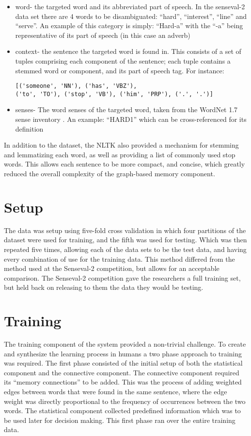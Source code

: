 \begin{itemize}     
	\item word- the targeted word and its abbreviated part of
speech. In the senseval-2 data set there are 4 words to be disambiguated:
``hard'', ``interest'', ``line'' and ``serve''. An example of this category is
simply: ``Hard-a'' with the ``-a'' being representative of its part of speech
(in this case an adverb)
	\item context- the sentence the targeted word is
found in. This consists of a set of tuples comprising each component of the
sentence; each tuple contains a stemmed word or component, and its part of
speech tag. For instance: \begin{verbatim}[('someone', 'NN'), ('has', 'VBZ'),
('to', 'TO'), ('stop', 'VB'), ('him', 'PRP'), ('.', '.')] \end{verbatim}
	\item senses- The word senses of the targeted word, taken from the WordNet 1.7
sense inventory . An example: ``HARD1'' which can be cross-referenced for its
definition 
\end{itemize}

In addition to the dataset, the NLTK also provided a mechanism for stemming and
lemmatizing each word, as well as providing a list of commonly used stop words.
This allows each sentence to be more compact, and concise, which greatly reduced
the overall complexity of the graph-based memory component.

\section{Setup}

The data was setup using five-fold cross validation in which four partitions of
the dataset were used for training, and the fifth was used for testing. Which
was then repeated five times, allowing each of the data sets to be the test
data, and having every combination of use for the training data.  This method
differed from the method used at the Senseval-2 competition, but allows for an
acceptable comparison.  The Senseval-2 competition gave the researchers a full
training set, but held back on releasing to them the data they would be testing.

\section{Training}

The training component of the system provided a non-trivial challenge.  To
create and synthesize the learning process in humans a two phase approach to
training was required.  The first phase consisted of the initial setup of both
the statistical component and the connective component. The connective component
required its ``memory connections'' to be added.  This was the process of adding
weighted edges between words that were found in the same sentence, where the
edge weight was directly proportional to the frequency of occurrences between
the two words.  The statistical component collected predefined information which
was to be used later for decision making.  This first phase ran over the entire
training data.

